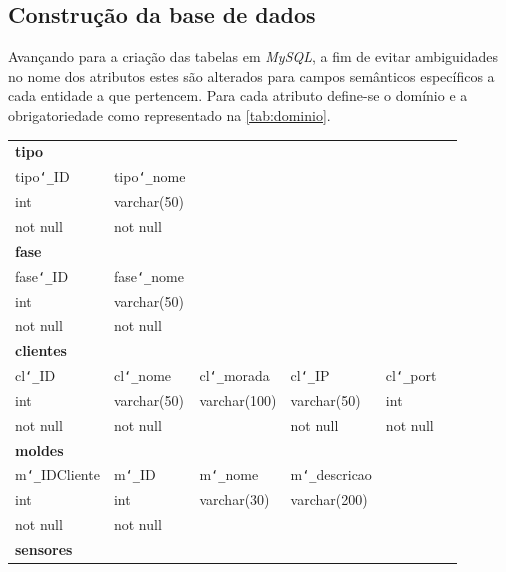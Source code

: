 \documentclass[11pt,twoside,a4paper]{report}
\begin{document}
\subsection{Construção da base de dados}
Avançando para a criação das tabelas em \textit{MySQL}, a fim de evitar ambiguidades no nome dos atributos estes são alterados para campos semânticos específicos a cada entidade a que pertencem. Para cada atributo define-se o domínio e a obrigatoriedade como representado na \autoref{tab:dominio}.
\begin{table}[H]
	\begin{tabular}{|l|l|l|l|l|l|}
		\multicolumn{6}{l}{\textbf{tipo}}\\ \cline{1-2}
		tipo\texttt{\char`_}ID & tipo\texttt{\char`_}nome & \multicolumn{4}{l}{}\\ \cline{1-2}
		int & varchar(50) & \multicolumn{4}{l}{}\\ \cline{1-2}
		not null & not null & \multicolumn{4}{l}{}\\ \cline{1-2}
		\multicolumn{6}{l}{\textbf{fase}}\\ \cline{1-2}
		fase\texttt{\char`_}ID & fase\texttt{\char`_}nome & \multicolumn{4}{l}{}\\ \cline{1-2}
		int & varchar(50) & \multicolumn{4}{l}{}\\ \cline{1-2}
		not null & not null & \multicolumn{4}{l}{}\\ \cline{1-2}
		\multicolumn{6}{l}{\textbf{clientes}}\\ \cline{1-5}
		cl\texttt{\char`_}ID & cl\texttt{\char`_}nome & cl\texttt{\char`_}morada & cl\texttt{\char`_}IP & cl\texttt{\char`_}port & \multicolumn{1}{l}{}\\ \cline{1-5}
		int & varchar(50) & varchar(100) & varchar(50) & int & \multicolumn{1}{l}{}\\ \cline{1-5}
		not null & not null & & not null & not null & \multicolumn{1}{l}{}\\ \cline{1-5}
		\multicolumn{6}{l}{\textbf{moldes}}\\ \cline{1-4}
		m\texttt{\char`_}IDCliente & m\texttt{\char`_}ID & 
		m\texttt{\char`_}nome & 
		m\texttt{\char`_}descricao & \multicolumn{2}{l}{}\\ \cline{1-4}
		int & int & varchar(30) & varchar(200) & \multicolumn{2}{l}{}\\ \cline{1-4}
		not null & not null & & &  \multicolumn{2}{l}{}\\ \cline{1-4}
		\multicolumn{6}{l}{\textbf{sensores}}\\ \cline{1-5}

\end{tabular}
\end{table}
\end{document}
